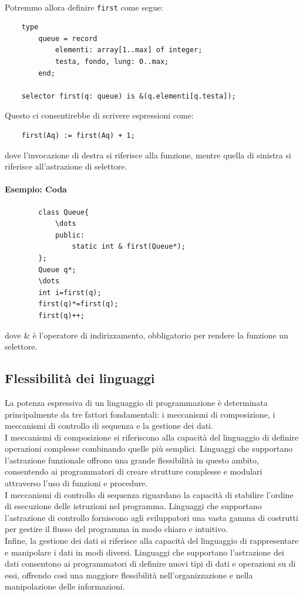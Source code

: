 \documentclass{article}
\begin{document}
	\vspace{\baselineskip} \\
	Potremmo allora definire \texttt{first} come segue:
	\begin{verbatim}
	type
		queue = record
			elementi: array[1..max] of integer;
			testa, fondo, lung: 0..max;
		end;

	selector first(q: queue) is &(q.elementi[q.testa]);
	\end{verbatim}
	Questo ci consentirebbe di scrivere espressioni come:
	\begin{verbatim}
	first(Aq) := first(Aq) + 1;
	\end{verbatim}
	dove l'invocazione di destra si riferisce alla funzione, mentre quella di sinistra si riferisce all'astrazione di selettore.

	\paragraph*{Esempio: Coda}
	\begin{verbatim}
		class Queue{
			\dots
			public:
				static int & first(Queue*);
		};
		Queue q*;
		\dots
		int i=first(q);
		first(q)*=first(q);
		first(q)++;
	\end{verbatim}
	dove \& è l'operatore di indirizzamento, obbligatorio per rendere la funzione un selettore.

	\subsection{Flessibilità dei linguaggi}
	La potenza espressiva di un linguaggio di programmazione è determinata principalmente da tre fattori fondamentali: i meccanismi di composizione, i meccanismi di controllo di sequenza e la gestione dei dati.
	\vspace{\baselineskip} \\
	I meccanismi di composizione si riferiscono alla capacità del linguaggio di definire operazioni complesse combinando quelle più semplici. Linguaggi che supportano l'astrazione funzionale offrono una grande flessibilità in questo ambito, consentendo ai programmatori di creare strutture complesse e modulari attraverso l'uso di funzioni e procedure.
	\vspace{\baselineskip} \\
	I meccanismi di controllo di sequenza riguardano la capacità di stabilire l'ordine di esecuzione delle istruzioni nel programma. Linguaggi che supportano l'astrazione di controllo forniscono agli sviluppatori una vasta gamma di costrutti per gestire il flusso del programma in modo chiaro e intuitivo.
	\vspace{\baselineskip} \\
	Infine, la gestione dei dati si riferisce alla capacità del linguaggio di rappresentare e manipolare i dati in modi diversi. Linguaggi che supportano l'astrazione dei dati consentono ai programmatori di definire nuovi tipi di dati e operazioni su di essi, offrendo così una maggiore flessibilità nell'organizzazione e nella manipolazione delle informazioni.
\end{document}
